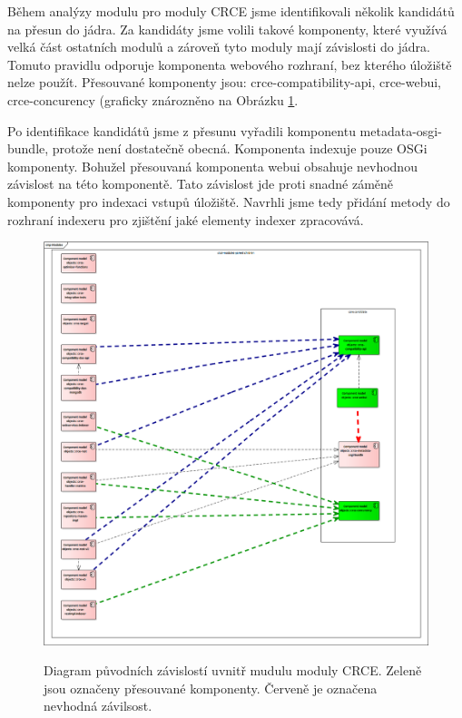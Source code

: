 \documentclass[12pt, a4paper]{article}
\begin{document}
Během analýzy modulu pro moduly CRCE jsme identifikovali několik kandidátů na přesun do jádra. Za kandidáty jsme volili takové komponenty, které využívá velká část ostatních modulů a zároveň tyto moduly mají závislosti do jádra. Tomuto pravidlu odporuje komponenta webového rozhraní, bez kterého úložiště nelze použít. Přesouvané komponenty jsou: crce-compatibility-api, crce-webui, crce-concurency (graficky znározněno na Obrázku \ref{fig:modulesCRCE}. 

Po identifikace kandidátů jsme z přesunu vyřadili komponentu metadata-osgi-bundle, protože není dostatečně obecná. Komponenta indexuje pouze OSGi komponenty. Bohužel přesouvaná komponenta webui obsahuje nevhodnou závislost na této komponentě. Tato závislost jde proti snadné záměně komponenty pro indexaci vstupů úložiště. Navrhli jsme tedy přidání metody do rozhraní indexeru pro zjištění jaké elementy indexer zpracovává.

\begin{figure}[h!]
\centering
\includegraphics[width=135mm]{modules.png}
\label{fig:modulesCRCE}
\caption{Diagram původních závislostí uvnitř mudulu moduly CRCE. Zeleně jsou označeny přesouvané komponenty. Červeně je označena nevhodná závilsost.}
\end{figure}
\end{document}
